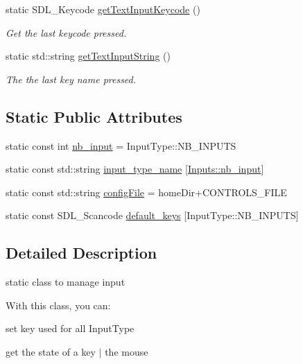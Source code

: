 \begin{DoxyCompactItemize}
static S\+D\+L\+\_\+\+Keycode \hyperlink{class_inputs_a6f07ed05a776562c7bf5e6a011b1ecfb}{get\+Text\+Input\+Keycode} ()
\begin{DoxyCompactList}\small\item\em Get the last keycode pressed. \end{DoxyCompactList}\item 
static std\+::string \hyperlink{class_inputs_aa87c9c60ec70181c57e93fa8c671291d}{get\+Text\+Input\+String} ()
\begin{DoxyCompactList}\small\item\em The the last key name pressed. \end{DoxyCompactList}\end{DoxyCompactItemize}
\subsection*{Static Public Attributes}
\begin{DoxyCompactItemize}
\item 
static const int \hyperlink{class_inputs_abcadc39fbb6eee0b5d5b571070bf79ef}{nb\+\_\+input} = Input\+Type\+::\+N\+B\+\_\+\+I\+N\+P\+U\+TS
\item 
static const std\+::string \hyperlink{class_inputs_a617379938c0c70b30922928e4fff4052}{input\+\_\+type\+\_\+name} \mbox{[}\hyperlink{class_inputs_abcadc39fbb6eee0b5d5b571070bf79ef}{Inputs\+::nb\+\_\+input}\mbox{]}
\item 
static const std\+::string \hyperlink{class_inputs_a22d4d9653fea3d145cbcfc3b91d49b84}{config\+File} = home\+Dir+C\+O\+N\+T\+R\+O\+L\+S\+\_\+\+F\+I\+LE
\item 
static const S\+D\+L\+\_\+\+Scancode \hyperlink{class_inputs_a4b883aab8a890c79347f37897e47af2d}{default\+\_\+keys} \mbox{[}Input\+Type\+::\+N\+B\+\_\+\+I\+N\+P\+U\+TS\mbox{]}
\end{DoxyCompactItemize}


\subsection{Detailed Description}
static class to manage input 

With this class, you can\+:
\begin{DoxyItemize}
\item set key used for all Input\+Type
\item get the state of a key $\vert$ the mouse 
\end{DoxyItemize}

